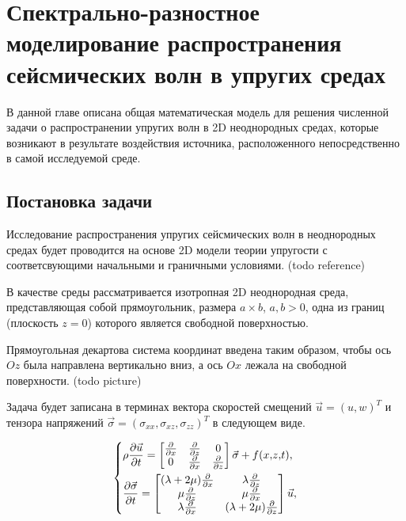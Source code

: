 \section{Спектрально-разностное моделирование распространения сейсмических волн в упругих средах}

В данной главе описана общая математическая модель для решения численной задачи о распространении
упругих волн в 2D неоднородных средах, которые возникают в результате воздействия источника,
расположенного непосредственно в самой исследуемой среде.

\subsection{Постановка задачи}
Исследование распространения упругих сейсмических волн в неоднородных средах будет проводится на 
основе 2D модели теории упругости с соответсвующими начальными и граничными условиями. (todo reference)

В качестве среды рассматривается изотропная 2D неоднородная среда, представляющая собой прямоугольник, размера $a \times b$, $a, b>0$,
одна из границ (плоскость $z = 0$) которого является свободной поверхностью.

Прямоугольная декартова система координат введена таким образом, чтобы ось $Oz$ была направлена вертикально вниз,
а ось $Ox$ лежала на свободной поверхности. (todo picture)

Задача будет записана в терминах вектора скоростей смещений $\vec{u}={(u, w)}^T$
и тензора напряжений $\vec{\sigma}=(\sigma_{xx}, \sigma_{xz}, \sigma_{zz})^T$ в следующем виде.

\begin{equation}
\label{eq:1}
\begin{dcases}
	\rho\frac{\partial{\vec{u}}}{\partial{t}}
	=\begin{bmatrix}
    \frac{\partial{}}{\partial{x}} & \frac{\partial{}}{\partial{z}} & 0 \\
    0 & \frac{\partial{}}{\partial{x}} & \frac{\partial{}}{\partial{z}}
	\end{bmatrix}
	\vec{\sigma} + f(x{,} z{,} t), \\
	\frac{\partial{\vec{\sigma}}}{\partial{t}}
	=\begin{bmatrix}
    (\lambda+2\mu)\frac{\partial{}}{\partial{x}} & \lambda\frac{\partial{}}{\partial{z}} \\
    \mu\frac{\partial{}}{\partial{z}} & \mu\frac{\partial{}}{\partial{x}} \\
    \lambda\frac{\partial{}}{\partial{x}} & (\lambda+2\mu)\frac{\partial{}}{\partial{z}}
	\end{bmatrix}
	\vec{u},
\end{dcases}
\end{equation}

